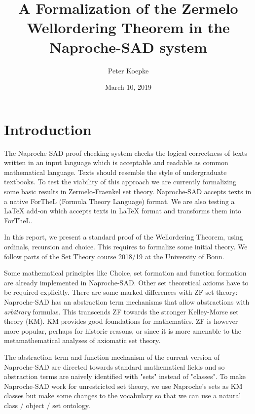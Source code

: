 \documentclass{article}
\begin{document}
\title{A Formalization of the Zermelo Wellordering Theorem in the Naproche-SAD system}

\author{Peter Koepke}

\date{March 10, 2019}

\maketitle


\section{Introduction}

The Naproche-SAD proof-checking system checks the logical correctness of texts written in an input language which is acceptable and readable as common mathematical language. Texts should resemble the style of undergraduate textbooks. To test the viability of this approach we are currently formalizing some basic results in Zermelo-Fraenkel set theory. Naproche-SAD accepts texts in a native ForTheL (Formula Theory Language) format. We are also testing a {\LaTeX} add-on which accepts texts in {\LaTeX} format and transforms them into ForTheL.

In this report, we present a standard proof of the Wellordering Theorem, using ordinals, recursion and choice. This requires
to formalize some initial theory. We follow parts of the Set Theory
course 2018/19 at the University of Bonn.

Some mathematical principles like Choice, set formation and function
formation are already implemented in Naproche-SAD. Other set theoretical
axioms have to be required explicitly. There are some marked differences with ZF set theory: Naproche-SAD has an abstraction term mechanisms that allow abstractions with {\it arbitrary} formulas. This transcends ZF towards the stronger Kelley-Morse set theory (KM). KM provides good foundations for mathematics. ZF is however more popular, perhaps for historic reasons, or
since it is more amenable to the metamathematical analyses of
axiomatic set theory.

The abstraction term and function mechanism of the current version 
of Naproche-SAD are directed towards standard mathematical fields and 
so abstraction terms are naively identified with "sets" instead of
"classes". To make Naproche-SAD work for unrestricted set theory, we
use Naproche's sets as KM classes but make some changes to the
vocabulary so that we can use a natural class / object / set ontology.
\end{document}

